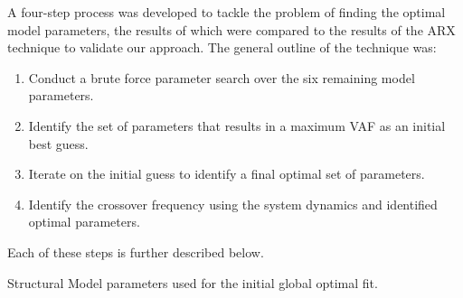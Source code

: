A four-step process was developed to tackle the problem of finding the optimal model parameters, the results of which were compared to the results of the ARX technique to validate our approach.
The general outline of the technique was:
\begin{enumerate}
    \item Conduct a brute force parameter search over the six remaining model parameters.
    \item Identify the set of parameters that results in a maximum VAF as an initial best guess.
    \item Iterate on the initial guess to identify a final optimal set of parameters.
    \item Identify the crossover frequency using the system dynamics and identified optimal parameters.
\end{enumerate}
Each of these steps is further described below.

\begin{table}[tb]
    \centering
    \caption[Structural Model parameters used for the initial global optimal fit]{Structural Model parameters used for the initial global optimal fit.}
    \label{table:structuralmodelparameters}
\end{table}

